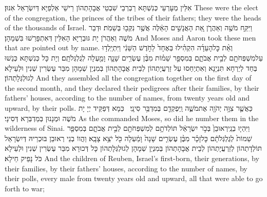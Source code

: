 {אִלֵּין מְעָרְעֵי כְּנִשְׁתָּא רַבְרְבֵי שִׁבְטֵי אֲבָהָתְהוֹן רֵישֵׁי אַלְפַיָּא דְּיִשְׂרָאֵל אִנּוּן׃}
{These were the elect of the congregation, the princes of the tribes of their fathers; they were the heads of the thousands of Israel.}{}
{וַיִּקַּ֥ח מֹשֶׁ֖ה וְאַהֲרֹ֑ן אֵ֚ת הָאֲנָשִׁ֣ים הָאֵ֔לֶּה אֲשֶׁ֥ר נִקְּב֖וּ בְּשֵׁמֹֽת׃}
{וּדְבַר מֹשֶׁה וְאַהֲרֹן יָת גּוּבְרַיָּא הָאִלֵּין דְּאִתְפָּרַשׁוּ בִּשְׁמָהָן׃}
{And Moses and Aaron took these men that are pointed out by name.}{}
{וְאֵ֨ת כׇּל\maqqaf הָעֵדָ֜ה הִקְהִ֗ילוּ בְּאֶחָד֙ לַחֹ֣דֶשׁ הַשֵּׁנִ֔י וַיִּתְיַֽלְד֥וּ עַל\maqqaf מִשְׁפְּחֹתָ֖ם לְבֵ֣ית אֲבֹתָ֑ם בְּמִסְפַּ֣ר שֵׁמ֗וֹת מִבֶּ֨ן עֶשְׂרִ֥ים שָׁנָ֛ה וָמַ֖עְלָה לְגֻלְגְּלֹתָֽם׃}
{וְיָת כָּל כְּנִשְׁתָּא כְּנַשׁוּ בְּחַד לְיַרְחָא תִּנְיָנָא וְאִתְיַחַסוּ עַל זַרְעֲיָתְהוֹן לְבֵית אֲבָהָתְהוֹן בְּמִנְיַן שְׁמָהָן מִבַּר עֶשְׂרִין שְׁנִין וּלְעֵילָא לְגוּלְגְּלָתְהוֹן׃}
{And they assembled all the congregation together on the first day of the second month, and they declared their pedigrees after their families, by their fathers’ houses, according to the number of names, from twenty years old and upward, by their polls.}{}
{כַּאֲשֶׁ֛ר צִוָּ֥ה יְהֹוָ֖ה אֶת\maqqaf מֹשֶׁ֑ה וַֽיִּפְקְדֵ֖ם בְּמִדְבַּ֥ר סִינָֽי׃ \setuma }
{כְּמָא דְּפַקֵּיד יְיָ יָת מֹשֶׁה וּמְנָנוּן בְּמַדְבְּרָא דְּסִינָי׃}
{As the \lord\space commanded Moses, so did he number them in the wilderness of Sinai.}{}
{וַיִּהְי֤וּ בְנֵֽי\maqqaf רְאוּבֵן֙ בְּכֹ֣ר יִשְׂרָאֵ֔ל תּוֹלְדֹתָ֥ם לְמִשְׁפְּחֹתָ֖ם לְבֵ֣ית אֲבֹתָ֑ם בְּמִסְפַּ֤ר שֵׁמוֹת֙ לְגֻלְגְּלֹתָ֔ם כׇּל\maqqaf זָכָ֗ר מִבֶּ֨ן עֶשְׂרִ֤ים שָׁנָה֙ וָמַ֔עְלָה כֹּ֖ל יֹצֵ֥א צָבָֽא׃}
{וַהֲווֹ בְנֵי רְאוּבֵן בּוּכְרֵיהּ דְּיִשְׂרָאֵל תּוֹלְדָתְהוֹן לְזַרְעֲיָתְהוֹן לְבֵית אֲבָהָתְהוֹן בְּמִנְיַן שְׁמָהָן לְגוּלְגְּלָתְהוֹן כָּל דְּכוּרָא מִבַּר עֶשְׂרִין שְׁנִין וּלְעֵילָא כֹּל נָפֵיק חֵילָא׃}
{And the children of Reuben, Israel’s first-born, their generations, by their families, by their fathers’ houses, according to the number of names, by their polls, every male from twenty years old and upward, all that were able to go forth to war;}{}
